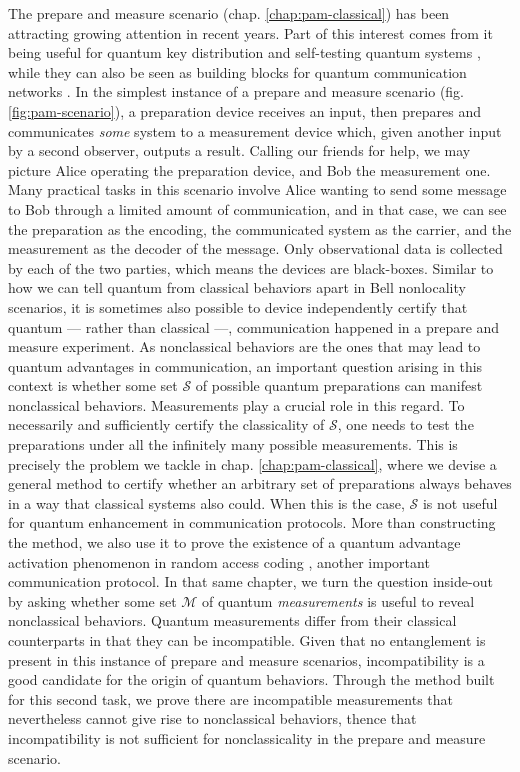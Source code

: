 The prepare and measure scenario (chap. \ref{chap:pam-classical}) has been attracting growing attention in recent years. Part of this interest comes from it being useful for quantum key distribution \cite{pawlowski_pamqkd_2011} and self-testing quantum systems \cite{tavakoli_selftesting_2018,tavakoli_selftesting_2020}, while they can also be seen as building blocks for quantum communication networks \cite{poderini_pamcriteria_2020,bowles_pamnetworks_2015}. In the simplest instance of a prepare and measure scenario (fig. \ref{fig:pam-scenario}), a preparation device receives an input, then prepares and communicates \emph{some} system to a measurement device which, given another input by a second observer, outputs a result. Calling our friends for help, we may picture Alice operating the preparation device, and Bob the measurement one. Many practical tasks in this scenario involve Alice wanting to send some message to Bob through a limited amount of communication, and in that case, we can see the preparation as the encoding, the communicated system as the carrier, and the measurement as the decoder of the message. Only observational data is collected by each of the two parties, which means the devices are black-boxes. Similar to how we can tell quantum from classical behaviors apart in Bell nonlocality scenarios, it is sometimes also possible to device independently certify that quantum --- rather than classical ---, communication happened in a prepare and measure experiment. As nonclassical behaviors are the ones that may lead to quantum advantages in communication, an important question arising in this context is whether some set $\mathcal{S}$ of possible quantum preparations can manifest nonclassical behaviors. Measurements play a crucial role in this regard. To necessarily and sufficiently certify the classicality of $\mathcal{S}$, one needs to test the preparations under all the infinitely many possible measurements. This is precisely the problem we tackle in chap. \ref{chap:pam-classical}, where we devise a general method to certify whether an arbitrary set of preparations always behaves in a way that classical systems also could. When this is the case, $\mathcal{S}$ is not useful for quantum enhancement in communication protocols. More than constructing the method, we also use it to prove the existence of a quantum advantage activation phenomenon in random access coding \cite{ambainis_qracsoriginal_1999}, another important communication protocol. In that same chapter, we turn the question inside-out by asking whether some set $\mathcal{M}$ of quantum \emph{measurements} is useful to reveal nonclassical behaviors. Quantum measurements differ from their classical counterparts in that they can be incompatible. Given that no entanglement is present in this instance of prepare and measure scenarios, incompatibility is a good candidate for the origin of quantum behaviors. Through the method built for this second task, we prove there are incompatible measurements that nevertheless cannot give rise to nonclassical behaviors, thence that incompatibility is not sufficient for nonclassicality in the prepare and measure scenario. %